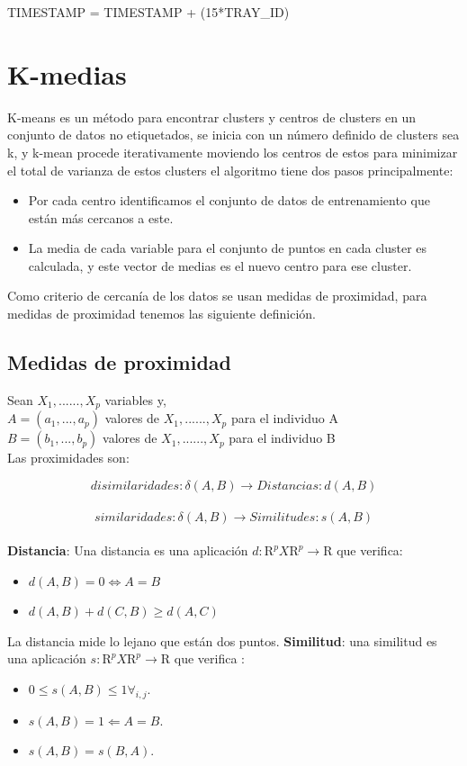 \documentclass[a4paper]{article}
\begin{document}
\begin{center}
TIMESTAMP = TIMESTAMP + (15*TRAY\_ID) 
\end{center}









\section{K-medias}
K-means es un método para encontrar clusters y centros de clusters en un conjunto de datos no
etiquetados, se inicia con un número definido de clusters sea k, y k-mean procede iterativamente
moviendo los centros de estos para minimizar el total de varianza de estos clusters el algoritmo
tiene dos pasos principalmente:
\begin{itemize}
\item Por cada centro identificamos el conjunto de datos de entrenamiento que están más cercanos a este.
\item La media de cada variable para el conjunto de puntos en cada cluster es calculada, y este vector de medias es el nuevo centro para ese cluster.
\end{itemize}

Como criterio de cercanía de los datos se usan medidas de proximidad, para medidas de proximidad tenemos las siguiente definici\'on.

\subsection{Medidas de proximidad}
Sean $X_{1},......,X_{p}$ variables y,
\\
$A=(a_{1},...,a_{p})$ valores de $X_{1},......,X_{p}$ para el individuo A
\\
$B=(b_{1},...,b_{p})$ valores de $X_{1},......,X_{p}$ para el individuo B
\\
Las proximidades son:

$$ disimilaridades : \delta(A,B) \rightarrow Distancias : d(A,B)$$
\\
$$ similaridades : \delta(A,B) \rightarrow Similitudes : s(A,B)$$
\\
\textbf{Distancia}: Una distancia es una aplicaci\'on  $d: \mathrm{R}^{p} X \mathrm{R}^{p} \rightarrow \mathrm{R}$ que verifica:
\begin{itemize}
\item $d(A,B)=0 \Longleftrightarrow A = B$
\item $d(A,B) + d(C,B) \geq d(A,C)$
\end{itemize}
La distancia mide lo lejano que están dos puntos.
\textbf{Similitud}: una similitud es una aplicaci\'on $s: \mathrm{R}^{p} X \mathrm{R}^{p} \rightarrow \mathrm{R}$ que verifica :
\begin{itemize}
\item $0 \leq s(A,B) \leq 1 \forall_{i,j}$.
\item $s(A,B) = 1 \Longleftarrow A = B$.
\item $s(A,B) = s(B,A)$.
\end{itemize}
\end{document}
